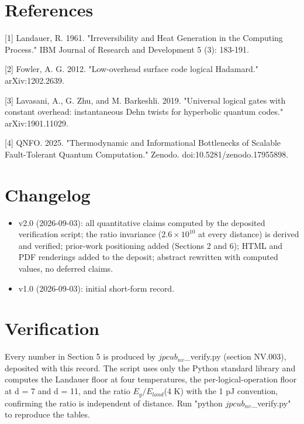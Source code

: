 \documentclass[11pt]{article}
\begin{document}
\section*{References}
[1] Landauer, R. 1961. "Irreversibility and Heat Generation in the Computing Process." IBM Journal of Research and Development 5 (3): 183-191.

[2] Fowler, A. G. 2012. "Low-overhead surface code logical Hadamard." arXiv:1202.2639.

[3] Lavasani, A., G. Zhu, and M. Barkeshli. 2019. "Universal logical gates with constant overhead: instantaneous Dehn twists for hyperbolic quantum codes." arXiv:1901.11029.

[4] QNFO. 2025. "Thermodynamic and Informational Bottlenecks of Scalable Fault-Tolerant Quantum Computation." Zenodo. doi:10.5281/zenodo.17955898.

\section*{Changelog}
\begin{itemize}
  \item v2.0 (2026-09-03): all quantitative claims computed by the deposited verification script; the ratio invariance ($2.6\times 10^{10}$ at every distance) is derived and verified; prior-work positioning added (Sections 2 and 6); HTML and PDF renderings added to the deposit; abstract rewritten with computed values, no deferred claims.
  \item v1.0 (2026-09-03): initial short-form record.
\end{itemize}
\section*{Verification}
Every number in Section 5 is produced by $jpcub_{nv}$\_verify.py (section NV.003), deposited with this record. The script uses only the Python standard library and computes the Landauer floor at four temperatures, the per-logical-operation floor at d = 7 and d = 11, and the ratio $E_{g} / E_{land}$(4 K) with the 1 pJ convention, confirming the ratio is independent of distance. Run "python $jpcub_{nv}$\_verify.py" to reproduce the tables.
\end{document}
